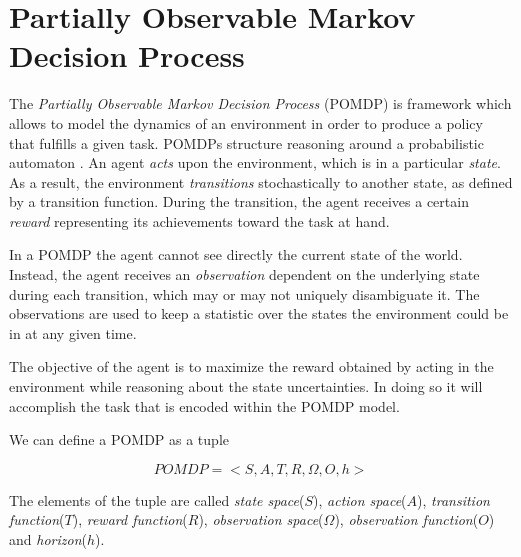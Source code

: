 \section{Partially Observable Markov Decision Process}\label{ref:pomdp}

The \textit{Partially Observable Markov Decision Process} (POMDP) \cite{cit:pomdp} is framework
which allows to model the dynamics of an environment in order to produce a policy that fulfills a
given task. POMDPs structure reasoning around a probabilistic automaton \cite{probabilistic automaton}. An agent \textit{acts}
upon the environment, which is in a particular \textit{state}. As a result, the environment
\textit{transitions} stochastically to another state, as defined by a transition function. During
the transition, the agent receives a certain \textit{reward} representing its achievements toward
the task at hand.

In a POMDP the agent cannot see directly the current state of the world. Instead, the agent receives
an \textit{observation} dependent on the underlying state during each transition, which may or may
not uniquely disambiguate it. The observations are used to keep a statistic over the states the
environment could be in at any given time.

The objective of the agent is to maximize the reward obtained by acting in the environment while
reasoning about the state uncertainties. In doing so it will accomplish the task that is encoded
within the POMDP model.

%

We can define a POMDP as a tuple

\begin{equation}
 POMDP = <S,A,T,R,\Omega,O,h>
\end{equation}

The elements of the tuple are called \textit{state space}($S$), \textit{action space}($A$),
\textit{transition function}($T$), \textit{reward function}($R$), \textit{observation
space}($\Omega$), \textit{observation function}($O$) and \textit{horizon}($h$).

